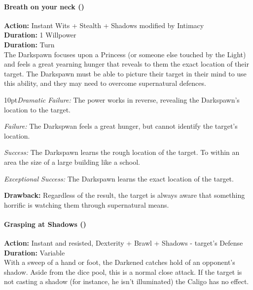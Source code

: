 \paragraph*{Breath on your neck (\textbullet\textbullet)}

\noindent \textbf{Action:} Instant Wits + Stealth + Shadows modified by Intimacy\\

\noindent \textbf{Duration:} 1 Willpower \\

\noindent \textbf{Duration:} Turn \\

\noindent The Darkspawn focuses upon a Princess (or someone else touched by the Light) and feels a great yearning hunger that reveals to them the exact location of their target. The Darkspawn must be able to picture their target in their mind to use this ability, and they may need to overcome supernatural defences. 

    \begin{myindentpar}{10pt}\emph{Dramatic Failure:} The power works in reverse, revealing the Darkspawn's location to the target.
    
    \emph{Failure:} The Darkspwan feels a great hunger, but cannot identify the target's location. 
    
    \emph{Success:} The Darkspawn learns the rough location of the target. To within an area the size of a large building like a school.
    
    \emph{Exceptional Success:} The Darkspawn learns the exact location of the target. \\\end{myindentpar}
    
    \noindent \textbf{Drawback:} Regardless of the result, the target is always aware that something horrific is watching them through supernatural means. 

\paragraph*{Grasping at Shadows (\textbullet\textbullet)}

\noindent \textbf{Action:} Instant and resisted, Dexterity + Brawl + Shadows - target's Defense\\

\noindent \textbf{Duration:} Variable \\

\noindent With a sweep of a hand or foot, the Darkened catches hold of an opponent's shadow. Aside from the dice pool, this is a normal close attack. If the target is not casting a shadow (for instance, he isn't illuminated) the Caligo has no effect.

